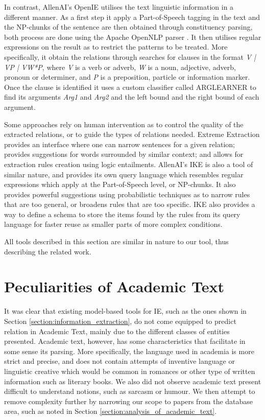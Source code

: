 \documentclass[11pt,a4paper,openright]{memoir}
\begin{document}
In contrast, AllenAI's OpenIE \cite{Etzioni:2011:OIE:2283396.2283398} utilises the text linguistic information in a different manner. As a first step it apply a Part-of-Speech tagging in the text and the NP-chunks of the sentence are then obtained through constituency parsing, both process are done using the Apache OpenNLP parser \cite{open-nlp}. It then utilises regular expressions on the result as to restrict the patterns to be treated. More specifically, it obtain the relations through searches for clauses in the format \emph{V | VP | VW*P}, where \emph{V} is a verb or adverb, \emph{W} is a noun, adjective, adverb, pronoun or determiner, and \emph{P} is a preposition, particle or information marker. Once the clause is identified it uses a custom classifier called ARGLEARNER to find its arguments \emph{Arg1} and \emph{Arg2} and the left bound and the right bound of each argument.

Some approaches rely on human intervention as to control the quality of the extracted relations, or to guide the types of relations needed. Extreme Extraction \cite{DBLP:journals/corr/HoffmannZW15} provides an interface where one can narrow sentences for a given relation; provides suggestions for words surrounded by similar context; and allows for extraction rules creation using logic entailments. AllenAI's IKE \cite{DBLP:conf/akbc/DalviBCCEFG16} is also a tool of similar nature, and provides its own query language which resembles regular expressions which apply at the Part-of-Speech level, or NP-chunks. It also provides powerful suggestions using probabilistic techniques as to narrow rules that are too general, or broadens rules that are too specific. IKE also provides a way to define a schema to store the items found by the rules from its query language for faster reuse as smaller parts of more complex conditions.

All tools described in this section are similar in nature to our tool, thus describing the related work.


%
%
%
%


\section{Peculiarities of Academic Text}

It was clear that existing model-based tools for IE, such as the ones shown in Section \ref{section:information_extraction}, do not come equipped to predict relation in Academic Text, mainly due to the different classes of entities presented. Academic text, however, has some characteristics that facilitate in some sense its parsing. More specifically, the language used in academia is more strict and precise, and does not contain attempts of inventive language or linguistic creative which would be common in romances or other type of written information such as literary books. We also did not observe academic text present difficult to understand notions, such as sarcasm or humour. We then attempt to remove complexity further by narrowing our scope to papers from the database area, such as noted in Section \ref{section:analysis_of_academic_text}.
\end{document}

